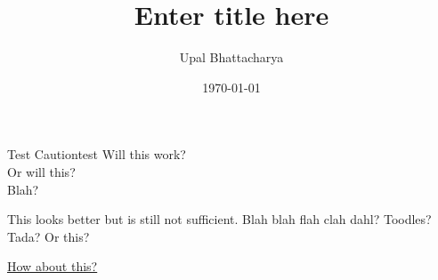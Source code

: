 \documentclass[a4paper]{article}
\author{Upal Bhattacharya}
\date{\today}
\title{Enter title here}
\begin{document}
\maketitle

\linenumbers
\begin{linenomath*}
\begin{caution}{Test Caution}{test}
  Will this work? \\
  Or will this? \\
  Blah?
\end{caution}
\end{linenomath*}

This looks better but is still not sufficient. Blah blah flah clah dahl? Toodles?
Tada? Or this?

\ul{How about this?}
\end{document}
